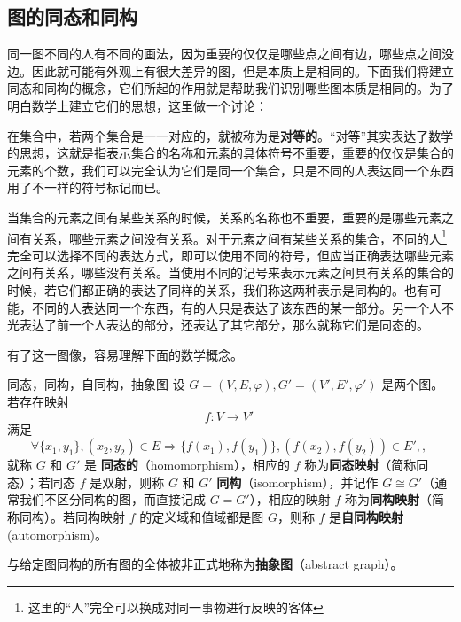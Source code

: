 \subsection{图的同态和同构}



同一图不同的人有不同的画法，因为重要的仅仅是哪些点之间有边，哪些点之间没边。因此就可能有外观上有很大差异的图，但是本质上是相同的。下面我们将建立同态和同构的概念，它们所起的作用就是帮助我们识别哪些图本质是相同的。为了明白数学上建立它们的思想，这里做一个讨论：

在集合中，若两个集合是一一对应的，就被称为是\textbf{对等的}。“对等”其实表达了数学的思想，这就是指表示集合的名称和元素的具体符号不重要，重要的仅仅是集合的元素的个数，我们可以完全认为它们是同一个集合，只是不同的人表达同一个东西用了不一样的符号标记而已。

当集合的元素之间有某些关系的时候，关系的名称也不重要，重要的是哪些元素之间有关系，哪些元素之间没有关系。对于元素之间有某些关系的集合，不同的人\footnote{这里的“人”完全可以换成对同一事物进行反映的客体}完全可以选择不同的表达方式，即可以使用不同的符号，但应当正确表达哪些元素之间有关系，哪些没有关系。当使用不同的记号来表示元素之间具有关系的集合的时候，若它们都正确的表达了同样的关系，我们称这两种表示是同构的。也有可能，不同的人表达同一个东西，有的人只是表达了该东西的某一部分。另一个人不光表达了前一个人表达的部分，还表达了其它部分，那么就称它们是同态的。

有了这一图像，容易理解下面的数学概念。
\begin{definition}{同态，同构，自同构，抽象图}
设 $G=(V,E,\varphi),G'=(V',E',\varphi')$ 是两个图。若存在映射
\begin{equation}
f:V\rightarrow V'~
\end{equation}
满足
\begin{equation}
\forall\{x_1,y_1\},(x_2,y_2)\in E\Rightarrow \{f(x_1),f(y_1)\},(f(x_2),f(y_2))\in E',,~
\end{equation}
就称 $G$ 和 $G'$ 是 \textbf{同态的}（homomorphism），相应的 $f$ 称为\textbf{同态映射}（简称同态）；若同态 $f$ 是双射，则称 $G$ 和 $G'$ \textbf{同构}（isomorphism），并记作 $G\cong G'$（通常我们不区分同构的图，而直接记成 $G=G'$），相应的映射 $f$ 称为\textbf{同构映射}（简称同构）。若同构映射 $f$ 的定义域和值域都是图 $G$，则称 $f$ 是\textbf{自同构映射}(automorphism)。

与给定图同构的所有图的全体被非正式地称为\textbf{抽象图}（abstract graph）。
\end{definition}


